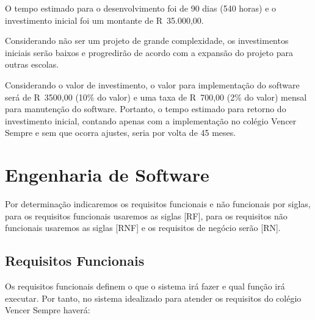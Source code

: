 \documentclass[
	12pt,				%
	openright,			%
	twoside,			%
	a4paper,			%
	english,			%
	french,				%
	spanish,			%
	brazil				%
	]{abntex2}
\begin{document}
O tempo estimado para o desenvolvimento foi de 90 dias (540 horas) e o investimento inicial foi um montante de R\textdollar\ 35.000,00.

Considerando não ser um projeto de grande complexidade, os investimentos
iniciais serão baixos e progredirão de acordo com a expansão do projeto para
outras escolas.

Considerando o valor de investimento, o valor para implementação do software
será de R\textdollar\ 3500,00 (10\% do valor) e uma taxa de R\textdollar\ 700,00 (2\% do valor) mensal
para manutenção do software. Portanto, o tempo estimado para retorno do
investimento inicial, contando apenas com a implementação no colégio Vencer
Sempre e sem que ocorra ajustes, seria por volta de 45 meses.

\chapter{Engenharia de Software}

Por determinação indicaremos os requisitos funcionais e não funcionais por
siglas, para os requisitos funcionais usaremos as siglas [RF], para os requisitos não funcionais usaremos as siglas [RNF] e os requisitos de negócio serão [RN].

\section{Requisitos Funcionais}

Os requisitos funcionais definem o que o sistema irá fazer e qual função irá
executar. Por tanto, no sistema idealizado para atender os requisitos do colégio
Vencer Sempre haverá:
\end{document}
